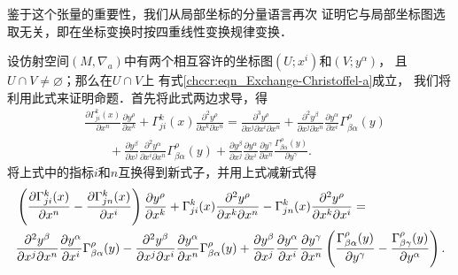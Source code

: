 
鉴于这个张量的重要性，我们从局部坐标的分量语言再次
证明它与局部坐标图选取无关，即在坐标变换时按四重线性变换规律变换．

设仿射空间$(M,\nabla_a)$中有两个相互容许的坐标图$(U;x^i)$和$(V;y^\alpha)$，
且$U\cap V \neq \varnothing$；那么在$U\cap V$上
有式\eqref{chccr:eqn_Exchange-Christoffel-a}成立，
我们将利用此式来证明命题．首先将此式两边求导，得
\begin{align*}
    &\frac{\partial \Gamma^{k}_{ji}(x)}{\partial x^n} \frac{\partial y^\rho}{\partial x^k} +
    \Gamma^{k}_{ji}(x) \frac{\partial^2 y^\rho}{\partial x^k\partial x^n} =
    \frac{\partial^3 y^\rho}{\partial x^j \partial x^i \partial x^n}
    +\frac{\partial^2 y^\beta}{\partial x^j\partial x^n}
      \frac{\partial y^\alpha}{\partial x^i} \Gamma^{\rho}_{\beta\alpha}(y) \\
    &\qquad +\frac{\partial y^\beta}{\partial x^j} \frac{\partial^2 y^\alpha}{\partial x^i\partial x^n}
      \Gamma^{\rho}_{\beta\alpha}(y)
    +\frac{\partial y^\beta}{\partial x^j} \frac{\partial y^\alpha}{\partial x^i}
    \frac{\partial y^\gamma}{\partial x^n} \frac{\Gamma^{\rho}_{\beta\alpha}(y)}{\partial y^\gamma} .
\end{align*}
将上式中的指标$i$和$n$互换得到新式子，并用上式减新式得
\setlength{\mathindent}{0em}
\begin{align}
    &\left(\frac{\partial \Gamma^{k}_{ji}(x)} {\partial x^n} -\frac{\partial \Gamma^{k}_{jn}(x)}{\partial x^i}\right)
     \frac{\partial y^\rho}{\partial x^k} +
    \Gamma^{k}_{ji}(x) \frac{\partial^2 y^\rho}{\partial x^k\partial x^n}
    -\Gamma^{k}_{jn}(x) \frac{\partial^2 y^\rho}{\partial x^k\partial x^i} =  \label{chccr:eqn_tmprgg} \\
    & \frac{\partial^2 y^\beta}{\partial x^j\partial x^n}
       \frac{\partial y^\alpha}{\partial x^i} \Gamma^{\rho}_{\beta\alpha}(y)
    -  \frac{\partial^2 y^\beta}{\partial x^j\partial x^i}
       \frac{\partial y^\alpha}{\partial x^n} \Gamma^{\rho}_{\beta\alpha}(y)
     +\frac{\partial y^\beta}{\partial x^j} \frac{\partial y^\alpha}
      {\partial x^i} \frac{\partial y^\gamma}{\partial x^n}
      \left( \frac{\Gamma^{\rho}_{\beta\alpha}(y)}{\partial y^\gamma}
    - \frac{\Gamma^{\rho}_{\beta\gamma}(y)}{\partial y^\alpha} \right) . \notag
\end{align}
